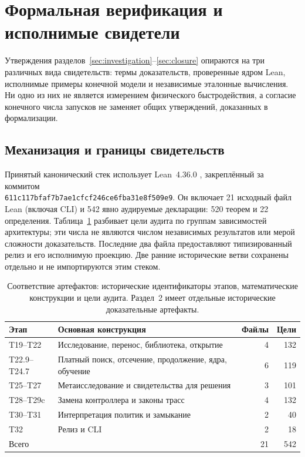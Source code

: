 \section{Формальная верификация и исполнимые свидетели}\label{sec:verification}
Утверждения разделов~\ref{sec:investigation}--\ref{sec:closure} опираются на три различных вида свидетельств: термы доказательств, проверенные ядром Lean, исполнимые примеры конечной модели и независимые эталонные вычисления. Ни одно из них не является измерением физического быстродействия, а согласие конечного числа запусков не заменяет общих утверждений, доказанных в формализации.

\subsection{Механизация и границы свидетельств}
Принятый канонический стек использует Lean~4.36.0 \cite{lean4}, закреплённый за коммитом\\
\texttt{611c117bfaf7b7ae1cfcf246ce6fba31e8f509e9}. Он включает 21 исходный файл Lean (включая CLI) и 542 явно аудируемые декларации: 520 теорем и 22 определения. Таблица~\ref{tab:formal-audit} разбивает цели аудита по группам зависимостей архитектуры; эти числа не являются числом независимых результатов или мерой сложности доказательств. Последние два файла предоставляют типизированный релиз и его исполнимую проекцию. Две ранние исторические ветви сохранены отдельно и не импортируются этим стеком.

\begin{table}[htbp]
\centering\small
\caption{Соответствие артефактов: исторические идентификаторы этапов, математические конструкции и цели аудита. Раздел~2 имеет отдельные исторические доказательные артефакты.}\label{tab:formal-audit}
\begin{tabularx}{\linewidth}{@{}lXrr@{}}\toprule
Этап & Основная конструкция & Файлы & Цели\\\midrule
T19--T22 & Исследование, перенос, библиотека, открытие & 4 & 132\\
T22.9--T24.7 & Платный поиск, отсечение, продолжение, ядра, обучение & 6 & 119\\
T25--T27 & Метаисследование и свидетельства для решения & 3 & 101\\
T28--T29c & Замена контроллера и законы трасс & 4 & 132\\
T30--T31 & Интерпретация политик и замыкание & 2 & 40\\
T32 & Релиз и CLI & 2 & 18\\\midrule
Всего & & 21 & 542\\\bottomrule
\end{tabularx}
\end{table}

